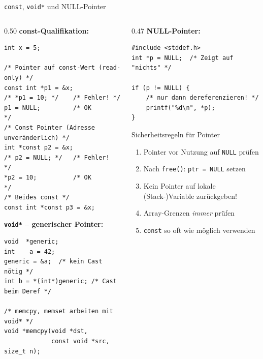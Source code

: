 \documentclass[%
  aspectratio=169,
  10pt
]{beamer}
\begin{document}
\begin{frame}[fragile]{\texttt{const}, \texttt{void*} und NULL-Pointer}
  \begin{columns}[T]
    \begin{column}{0.50\textwidth}
      \textbf{const-Qualifikation:}
\begin{lstlisting}
int x = 5;

/* Pointer auf const-Wert (read-only) */
const int *p1 = &x;
/* *p1 = 10; */    /* Fehler! */
p1 = NULL;         /* OK       */
/* Const Pointer (Adresse unveränderlich) */
int *const p2 = &x;
/* p2 = NULL; */   /* Fehler!  */
*p2 = 10;          /* OK       */
/* Beides const */
const int *const p3 = &x;
\end{lstlisting}
      \textbf{\texttt{void*} -- generischer Pointer:}
\begin{lstlisting}
void  *generic;
int    a = 42;
generic = &a;  /* kein Cast nötig */
int b = *(int*)generic; /* Cast beim Deref */

/* memcpy, memset arbeiten mit void* */
void *memcpy(void *dst,
             const void *src, size_t n);
\end{lstlisting}
    \end{column}
    \begin{column}{0.47\textwidth}
      \textbf{NULL-Pointer:}
\begin{lstlisting}
#include <stddef.h>
int *p = NULL;  /* Zeigt auf "nichts" */

if (p != NULL) {
    /* nur dann dereferenzieren! */
    printf("%d\n", *p);
}
\end{lstlisting}
      \vspace{0.3em}
      \begin{alertblock}{Sicherheitsregeln für Pointer}
        \begin{enumerate}
          \item Pointer vor Nutzung auf \texttt{NULL} prüfen
          \item Nach \texttt{free()}: \texttt{ptr = NULL} setzen
          \item Kein Pointer auf lokale (Stack-)Variable zurückgeben!
          \item Array-Grenzen \emph{immer} prüfen
          \item \texttt{const} so oft wie möglich verwenden
        \end{enumerate}
      \end{alertblock}
    \end{column}
  \end{columns}
\end{frame}
\end{document}
